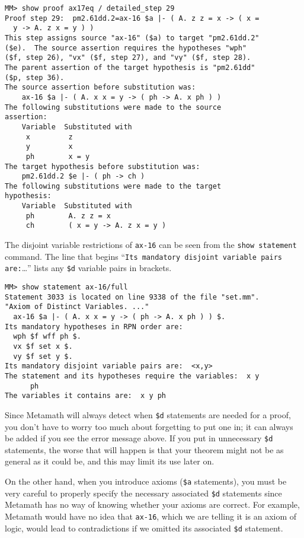 \begin{verbatim}
MM> show proof ax17eq / detailed_step 29
Proof step 29:  pm2.61dd.2=ax-16 $a |- ( A. z z = x -> ( x =
  y -> A. z x = y ) )
This step assigns source "ax-16" ($a) to target "pm2.61dd.2"
($e).  The source assertion requires the hypotheses "wph"
($f, step 26), "vx" ($f, step 27), and "vy" ($f, step 28).
The parent assertion of the target hypothesis is "pm2.61dd"
($p, step 36).
The source assertion before substitution was:
    ax-16 $a |- ( A. x x = y -> ( ph -> A. x ph ) )
The following substitutions were made to the source
assertion:
    Variable  Substituted with
     x         z
     y         x
     ph        x = y
The target hypothesis before substitution was:
    pm2.61dd.2 $e |- ( ph -> ch )
The following substitutions were made to the target
hypothesis:
    Variable  Substituted with
     ph        A. z z = x
     ch        ( x = y -> A. z x = y )
\end{verbatim}

The disjoint variable restrictions of \texttt{ax-16} can be seen from the
\texttt{show state\-ment} command.  The line that begins ``\texttt{Its mandatory
dis\-joint var\-i\-able pairs are:}\ldots'' lists any \texttt{\$d} variable
pairs in brackets.

\begin{verbatim}
MM> show statement ax-16/full
Statement 3033 is located on line 9338 of the file "set.mm".
"Axiom of Distinct Variables. ..."
  ax-16 $a |- ( A. x x = y -> ( ph -> A. x ph ) ) $.
Its mandatory hypotheses in RPN order are:
  wph $f wff ph $.
  vx $f set x $.
  vy $f set y $.
Its mandatory disjoint variable pairs are:  <x,y>
The statement and its hypotheses require the variables:  x y
      ph
The variables it contains are:  x y ph
\end{verbatim}

Since Metamath will always detect when \texttt{\$d}
statements are needed for a proof, you don't have to worry too much about
forgetting to put one in; it can always be added if you see the error message
above.  If you put in unnecessary \texttt{\$d} statements, the worse that will
happen is that your theorem might not be as general as it could be, and this
may limit its use later on.

On the other hand, when you introduce axioms (\texttt{\$a} statements), you must be very careful to properly specify the
necessary associated \texttt{\$d} statements since Metamath has no way of knowing
whether your axioms are correct.  For example, Metamath would have no idea
that \texttt{ax-16}, which we are telling it is an axiom of logic, would lead to
contradictions if we omitted its associated \texttt{\$d} statement.

